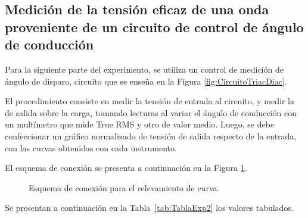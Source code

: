   \subsection{Medición de la tensión eficaz de una onda proveniente de un circuito de control de ángulo de conducción}
Para la siguiente parte del experimento, se utiliza un control de medición 
de ángulo de disparo, circuito que se enseña en la Figura \ref{fig:CircuitoTriacDiac}.



El procedimiento consiste en medir la tensión de entrada al circuito, 
y medir la de salida sobre la carga, tomando lecturas
al variar el ángulo de conducción con un multímetro que mide True RMS y otro de valor medio. 
Luego, se debe confeccionar un gráfico normalizado de tensión de salida 
respecto de la entrada, con las curvas obtenidas con cada instrumento.

El esquema de conexión se presenta a continuación en la Figura \ref{fig:EsquemaConexionTriac}.

\begin{figure}[H]
  \centering
  \caption{Esquema de conexión para el relevamiento de curva.}
  \label{fig:EsquemaConexionTriac}
\end{figure}

Se presentan a continuación en la Tabla~\ref{tab:TablaExp2} los valores tabulados.

